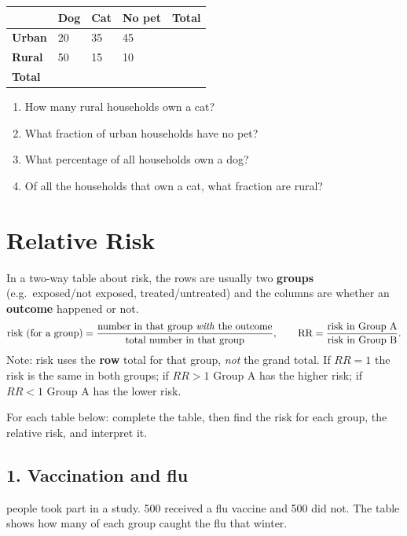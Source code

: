 \documentclass[11pt]{article}
\newcommand{\ans}{\hrulefill}
\begin{document}
\begin{center}
\begin{tabular}{|L|Y|Y|Y|Y|}
\hline
 & Dog & Cat & No pet & \textbf{Total} \\\hline
\textbf{Urban} & 20 & 35 & 45 & \\\hline
\textbf{Rural} & 50 & 15 & 10 & \\\hline
\textbf{Total} &    &    &    & \\\hline
\end{tabular}
\end{center}

\begin{enumerate}
  \item How many rural households own a cat? \ans
  \item What fraction of urban households have no pet? \ans
  \item What percentage of all households own a dog? \ans
  \item Of all the households that own a cat, what fraction are rural? \ans
\end{enumerate}

\newpage
\section{Relative Risk}
\noindent In a two-way table about risk, the rows are usually two \textbf{groups} (e.g.\ exposed/not exposed, treated/untreated) and the columns are whether an \textbf{outcome} happened or not.
\[
  \text{risk (for a group)} = \dfrac{\text{number in that group \emph{with} the outcome}}{\text{total number in that group}}, \qquad
  \text{RR} = \dfrac{\text{risk in Group A}}{\text{risk in Group B}}.
\]
\noindent Note: risk uses the \textbf{row} total for that group, \emph{not} the grand total. \quad
If $RR=1$ the risk is the same in both groups; if $RR>1$ Group A has the higher risk; if $RR<1$ Group A has the lower risk.

\vspace{0.3em}
\noindent For each table below: complete the table, then find the risk for each group, the relative risk, and interpret it.

\subsection*{1. Vaccination and flu}
 people took part in a study. 500 received a flu vaccine and 500 did not. The table shows how many of each group caught the flu that winter.
\end{document}
